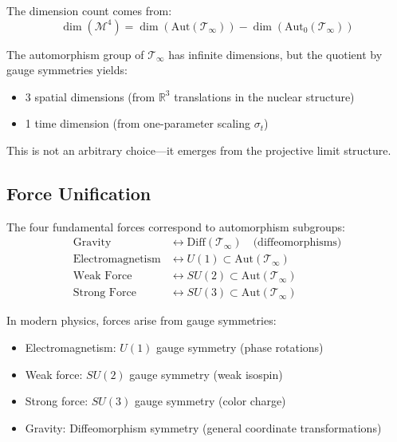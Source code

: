 \begin{defn}
\begin{level2}
The dimension count comes from:
\begin{equation}
\dim(\mathcal{M}^4) = \dim(\text{Aut}(\mathcal{T}_\infty)) - \dim(\text{Aut}_0(\mathcal{T}_\infty))
\end{equation}

The automorphism group of $\mathcal{T}_\infty$ has infinite dimensions, but the quotient by gauge symmetries yields:
\begin{itemize}
\item 3 spatial dimensions (from $\mathbb{R}^3$ translations in the nuclear structure)
\item 1 time dimension (from one-parameter scaling $\sigma_t$)
\end{itemize}

This is not an arbitrary choice—it emerges from the projective limit structure\cite{connes_noncommutative_1994}.
\end{level2}

\subsection{Force Unification}

\begin{thm}\label{thm:force-emergence}
The four fundamental forces correspond to automorphism subgroups:
\begin{align}
\text{Gravity} &\leftrightarrow \text{Diff}(\mathcal{T}_\infty) \quad \text{(diffeomorphisms)} \label{eq:gravity-diff}\\
\text{Electromagnetism} &\leftrightarrow U(1) \subset \text{Aut}(\mathcal{T}_\infty) \label{eq:em-u1}\\
\text{Weak Force} &\leftrightarrow SU(2) \subset \text{Aut}(\mathcal{T}_\infty) \label{eq:weak-su2}\\
\text{Strong Force} &\leftrightarrow SU(3) \subset \text{Aut}(\mathcal{T}_\infty) \label{eq:strong-su3}
\end{align}
\end{thm}

\begin{keyidea}
In modern physics, forces arise from gauge symmetries:
\begin{itemize}
\item Electromagnetism: $U(1)$ gauge symmetry (phase rotations)
\item Weak force: $SU(2)$ gauge symmetry (weak isospin)
\item Strong force: $SU(3)$ gauge symmetry (color charge)
\item Gravity: Diffeomorphism symmetry (general coordinate transformations)
\end{itemize}


\end{keyidea}
\end{defn}
